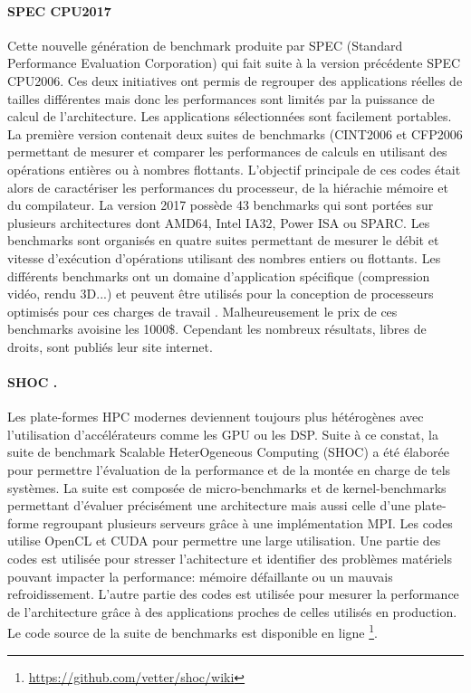 \paragraph{SPEC CPU2017} Cette nouvelle génération de benchmark produite par SPEC (Standard Performance Evaluation Corporation) qui fait suite à la version précédente SPEC CPU2006. Ces deux initiatives ont permis de regrouper des applications réelles de tailles différentes mais donc les performances sont limités par la puissance de calcul de l'architecture. Les applications sélectionnées sont facilement portables. La première version contenait deux suites de benchmarks (CINT2006 et CFP2006 permettant de mesurer et comparer les performances de calculs en utilisant des opérations entières ou à nombres flottants. L'objectif principale de ces codes était alors de caractériser les performances du processeur, de la hiérachie mémoire et du compilateur. La version 2017 possède 43 benchmarks qui sont portées sur plusieurs architectures dont AMD64, Intel IA32, Power ISA ou SPARC. Les benchmarks sont organisés en quatre suites permettant de mesurer le débit et vitesse d'exécution d'opérations utilisant des nombres entiers ou flottants.  Les différents benchmarks ont un domaine d'application spécifique (compression vidéo, rendu 3D...) et peuvent être utilisés pour la conception de processeurs optimisés pour ces charges de travail \cite{Panda2018}. Malheureusement le prix de ces benchmarks avoisine les 1000\$. Cependant les nombreux résultats, libres de droits, sont publiés leur site internet. 

\paragraph{SHOC \cite{danalis2010scalable}.} Les plate-formes HPC modernes deviennent toujours plus hétérogènes avec l'utilisation d'accélérateurs comme les GPU ou les DSP. Suite à ce constat, la suite de benchmark Scalable HeterOgeneous Computing (SHOC) a été élaborée pour permettre l'évaluation de la performance et de la montée en charge de tels systèmes. La suite est composée de micro-benchmarks et de kernel-benchmarks permettant d'évaluer précisément une architecture mais aussi celle d'une plate-forme regroupant plusieurs serveurs grâce à une implémentation MPI. Les codes utilise OpenCL et CUDA pour permettre une large utilisation. Une partie des codes est utilisée pour stresser l'achitecture et identifier des problèmes matériels pouvant impacter la performance: mémoire défaillante ou un mauvais refroidissement. L'autre partie des codes est utilisée pour mesurer la performance de l'architecture grâce à des applications proches de celles utilisés en production. Le code source de la suite de benchmarks est disponible en ligne \footnote{\url{https://github.com/vetter/shoc/wiki}}.


